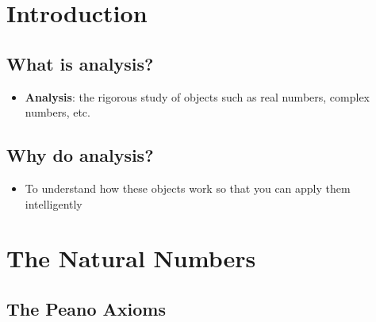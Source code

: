 \documentclass[11pt]{article}
\begin{document}
\section{Introduction}

\subsection{What is analysis?}

\begin{itemize}
  \item \textbf{Analysis}: the rigorous study of objects such as real numbers, complex numbers, etc.
\end{itemize}

\subsection{Why do analysis?}

\begin{itemize}
  \item To understand how these objects work so that you can apply them intelligently
\end{itemize}

\section{The Natural Numbers}

\subsection{The Peano Axioms}
\end{document}
